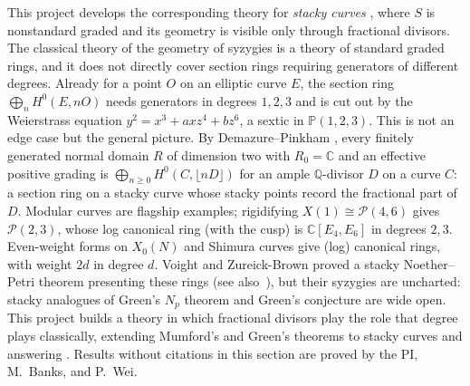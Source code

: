 \documentclass[11pt,reqno]{amsart}
\theoremstyle{remark}
\newcommand{\CC}{\mathbb{C}}
\newcommand{\PP}{\mathbb{P}}
\newcommand{\QQ}{\mathbb{Q}}
\newcommand{\cP}{\mathcal{P}}
\begin{document}
This project develops the corresponding theory for \emph{stacky curves} \cite{abramovichVistoli02,cadman07,AGV08}, where $S$ is nonstandard graded and its geometry is visible only through fractional divisors. The classical theory of the geometry of syzygies is a theory of standard graded rings, and it does not directly cover section rings requiring generators of different degrees. Already for a point $O$ on an elliptic curve $E$, the section ring $\bigoplus_n H^0(E,nO)$ needs generators in degrees $1,2,3$ and is cut out by the Weierstrass equation $y^2=x^3+axz^4+bz^6$, a sextic in $\PP(1,2,3)$. This is not an edge case but the general picture. By Demazure--Pinkham \cite{pinkham77,demazure88,watanabe81}, every finitely generated normal domain $R$ of dimension two with $R_0=\CC$ and an effective positive grading is $\bigoplus_{n\ge0}H^0(C,\lfloor nD\rfloor)$ for an ample $\QQ$-divisor $D$ on a curve $C$: a section ring on a stacky curve whose stacky points record the fractional part of $D$. Modular curves are flagship examples; rigidifying $X(1)\cong \cP(4,6)$ gives $\cP(2,3)$, whose log canonical ring (with the cusp) is $\CC[E_4,E_6]$ in degrees $2,3$. Even-weight forms on $X_0(N)$ and Shimura curves give (log) canonical rings, with weight $2d$ in degree $d$. Voight and Zureick-Brown \cite{voightZurieckBrown22} proved a stacky Noether--Petri theorem presenting these rings (see also~\cite{odorney15,LRZ16}), but their syzygies are uncharted: stacky analogues of Green's $N_p$ theorem and Green's conjecture are wide open. This project builds a theory in which fractional divisors play the role that degree plays classically, extending Mumford's and Green's theorems to stacky curves and answering \cite[Ques.~7.7]{brownErman25}. Results without citations in this section are proved by the PI, M.~Banks, and P.~Wei. 
\end{document}
